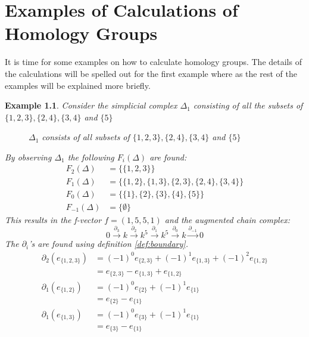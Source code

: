\documentclass[11pt,a4paper,twoside]{report}
\newtheorem{myex}[mythm]{Example}
\begin{document}
\chapter{Examples of Calculations of Homology Groups}
It is time for some examples on how to calculate homology groups. The details of the calculations will be spelled out for the first example where as the rest of the examples will be explained more briefly.
\begin{myex}
Consider the simplicial complex $\Delta_1$ consisting of all the subsets of $\{1,2,3\},\{2,4\},\{3,4\}$ and $\{5\}$
\begin{figure}[H]
\center
{}
\caption{$\Delta_1$ consists of all subsets of $\{1,2,3\},\{2,4\},\{3,4\}$ and $\{5\}$}
\label{fig:ex1}
\end{figure}
By observing $\Delta_1$ the following $F_i(\Delta)$ are found:
\begin{align*}
F_2(\Delta) &= \{\{1,2,3\}\}\\
F_1(\Delta) &= \{\{1,2\},\{1,3\},\{2,3\},\{2,4\},\{3,4\}\}\\
F_0(\Delta) &= \{\{1\},\{2\},\{3\},\{4\},\{5\}\}\\
F_{-1}(\Delta) &= \{\emptyset\}
\end{align*}
This results in the f-vector $f=(1,5,5,1)$ and the augmented chain complex:
\begin{equation*}
0\overset{\partial_3}{\to} k\overset{\partial_2}{\to} k^5\overset{\partial_1}{\to} k^5\overset{\partial_0}{\to} k \overset{\partial_{-1}}{\to} 0
\end{equation*}
The $\partial_i$'s are found using definition \ref{def:boundary}. 
\begin{align*}
\partial_2(e_{\{1,2,3\}})&=(-1)^0e_{\{2,3\}}+(-1)^1e_{\{1,3\}}+(-1)^2e_{\{1,2\}}\\
&=e_{\{2,3\}}-e_{\{1,3\}}+e_{\{1,2\}}\\
\partial_1(e_{\{1,2\}})&=(-1)^0e_{\{2\}}+(-1)^1e_{\{1\}}\\
&=e_{\{2\}}-e_{\{1\}}\\
\partial_1(e_{\{1,3\}})&=(-1)^0e_{\{3\}}+(-1)^1e_{\{1\}}\\
&=e_{\{3\}}-e_{\{1\}}\\

\end{align*}
\end{myex}
\end{document}
